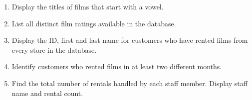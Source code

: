 \documentclass[12pt,a4paper]{article}
\newif\ifshowsolutions
\begin{document}
\begin{enumerate}

    \item Display the titles of films that start with a vowel.

    \ifshowsolutions
    \begin{lstlisting}[language=SQL]
    SELECT title
    FROM film
    WHERE LOWER(title) LIKE 'a%'
       OR LOWER(title) LIKE 'e%'
       OR LOWER(title) LIKE 'i%'
       OR LOWER(title) LIKE 'o%'
       OR LOWER(title) LIKE 'u%';
    \end{lstlisting}
    \fi
        
    \item List all distinct film ratings available in the database.

    \ifshowsolutions
    \begin{lstlisting}[language=SQL]
    SELECT DISTINCT rating
    FROM film;
    \end{lstlisting}
    \fi
    

    \item Display the ID, first and last name for customers who have rented films from every store in the database.

    \ifshowsolutions
    \begin{lstlisting}[language=SQL]
    SELECT c.customer_id, c.first_name, c.last_name
    FROM customer c
    JOIN rental r ON c.customer_id = r.customer_id
    JOIN inventory i ON r.inventory_id = i.inventory_id
    GROUP BY c.customer_id, c.first_name, c.last_name
    HAVING COUNT(DISTINCT i.store_id) = (SELECT COUNT(*) FROM store);
    \end{lstlisting}
    \fi
    


    \item Identify customers who rented films in at least two different months.

    \ifshowsolutions
    \begin{lstlisting}[language=SQL]
    SELECT customer_id
    FROM rental
    GROUP BY customer_id
    HAVING COUNT(DISTINCT EXTRACT(MONTH FROM rental_date)) >= 2;
    \end{lstlisting}
    \fi


    \item Find the total number of rentals handled by each staff member. Display staff name and rental count.
    
    \ifshowsolutions
    \begin{lstlisting}[language=SQL]
    SELECT s.first_name, s.last_name, COUNT(r.rental_id) AS rental_count
    FROM staff s
    JOIN rental r ON s.staff_id = r.staff_id
    GROUP BY s.staff_id, s.first_name, s.last_name;
    \end{lstlisting}
    \fi




\end{enumerate}
\end{document}
